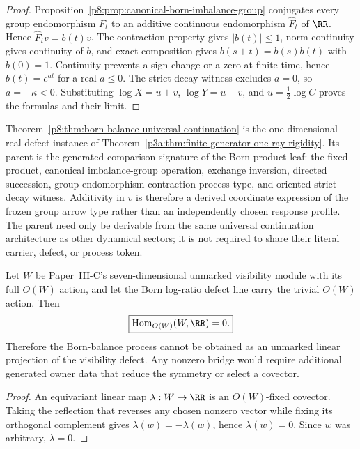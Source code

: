 \documentclass[12pt,a4paper]{article}
\begin{document}
\begin{proof}
Proposition~\ref{p8:prop:canonical-born-imbalance-group} conjugates every
group endomorphism \(F_t\) to an additive continuous endomorphism
\(\widehat F_t\) of \(\RR\).  Hence
\(\widehat F_t v=b(t)v\).  The contraction property gives \(|b(t)|\le1\), norm
continuity gives continuity of \(b\), and exact composition gives
\(b(s+t)=b(s)b(t)\) with \(b(0)=1\).  Continuity prevents a sign change or a
zero at finite time, hence \(b(t)=e^{at}\) for a real \(a\le0\).  The strict
decay witness excludes \(a=0\), so \(a=-\kappa<0\).  Substituting
\(\log X=u+v\), \(\log Y=u-v\), and \(u=\frac12\log C\) proves the formulas
and their limit.
\end{proof}

\begin{corollary}
\label{p8:cor:born-balance-universal-instance}
Theorem~\ref{p8:thm:born-balance-universal-continuation} is the
one-dimensional real-defect instance of
Theorem~\ref{p3a:thm:finite-generator-one-ray-rigidity}.  Its parent is the
generated comparison signature of the Born-product leaf: the fixed product,
canonical imbalance-group operation, exchange inversion, directed succession,
group-endomorphism contraction process type, and oriented strict-decay
witness.  Additivity in \(v\) is therefore a derived coordinate expression of
the frozen group arrow type rather than an independently chosen response
profile.  The parent need only be derivable from the same
universal continuation architecture as other dynamical sectors; it is not
required to share their literal carrier, defect, or process token.
\end{corollary}

\begin{proposition}
\label{p8:prop:no-visibility-balance-linear-bridge}
Let \(W\) be Paper~III-C's seven-dimensional unmarked visibility module with
its full \(O(W)\) action, and let the Born log-ratio defect line carry the
trivial \(O(W)\) action.  Then
\[
 \boxed{\operatorname{Hom}_{O(W)}(W,\RR)=0.}
\]
Therefore the Born-balance process cannot be obtained as an unmarked linear
projection of the visibility defect.  Any nonzero bridge would require
additional generated owner data that reduce the symmetry or select a
covector.
\end{proposition}

\begin{proof}
An equivariant linear map \(\lambda:W\to\RR\) is an \(O(W)\)-fixed covector.
Taking the reflection that reverses any chosen nonzero vector while fixing its
orthogonal complement gives \(\lambda(w)=-\lambda(w)\), hence
\(\lambda(w)=0\).  Since \(w\) was arbitrary, \(\lambda=0\).
\end{proof}
\end{document}
